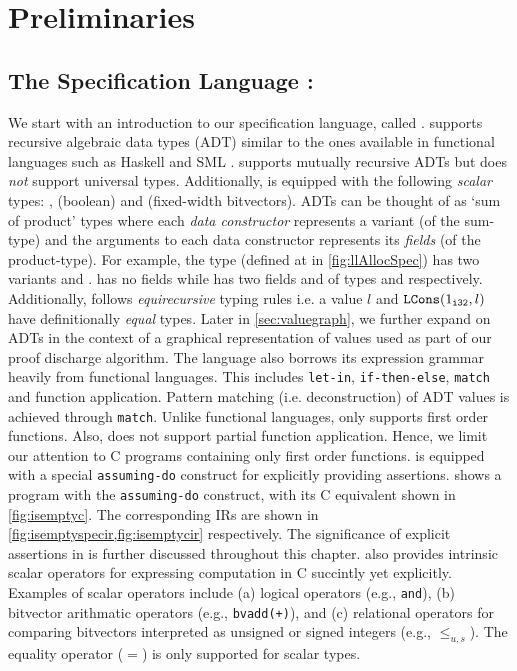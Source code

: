 \chapter{Preliminaries}
\label{sec:prelims}



\section{The Specification Language : \SpecL{}}
\label{sec:speclang}
We start with an introduction to our specification language, called \SpecL{}.
\SpecL{} supports recursive algebraic data types (ADT) \cite{algebraicdatatypes} similar to the
ones available in functional languages such as Haskell \cite{marlow2010haskell} and SML \cite{standardmlspec}.
\SpecL{} supports mutually recursive ADTs but does {\em not} support universal types.
Additionally, \SpecL{} is equipped with the following {\em scalar} types: ,  (boolean) and  (fixed-width bitvectors).
ADTs can be thought of as `sum of product' types where each {\em data constructor} represents a variant (of the sum-type)
and the arguments to each data constructor represents its {\em fields} (of the product-type).
For example, the  type (defined at  in \cref{fig:llAllocSpec}) has two variants  and .
 has no fields while  has two fields  and  of types  and  respectively.
Additionally, \SpecL{} follows {\em equirecursive} typing rules i.e.
a  value $l$ and ${\tt LCons}(1_{\tt i32}, l)$ have definitionally {\em equal} types.
Later in \cref{sec:valuegraph}, we further expand on ADTs in the context of a
graphical representation of values used as part of our proof discharge algorithm.
The language also borrows its expression grammar heavily from functional languages.
This includes {\tt let-in}, {\tt if-then-else}, {\tt match} and function application.
Pattern matching (i.e. deconstruction) of ADT values is achieved through {\tt match}.
Unlike functional languages, \SpecL{} only supports first order functions.
Also, \SpecL{} does not support partial function application.
Hence, we limit our attention to C programs containing only first order functions.
\SpecL{} is equipped with a special {\tt assuming-do} construct for explicitly providing assertions.
 shows a \SpecL{} program with the {\tt assuming-do} construct, with its C equivalent
shown in \cref{fig:isemptyc}.
The corresponding IRs are shown in \cref{fig:isemptyspecir,fig:isemptycir} respectively.
The significance of explicit assertions in \SpecL{} is further discussed throughout this chapter.
\SpecL{} also provides intrinsic scalar operators for expressing computation in C succintly yet explicitly.
Examples of scalar operators include (a) logical operators (e.g., {\tt and}), (b) bitvector arithmatic operators (e.g., {\tt bvadd(+)}),
and (c) relational operators for comparing bitvectors interpreted as unsigned or signed integers (e.g., $\leq_{u,s}$).
The equality operator ($=$) is only supported for scalar types.

